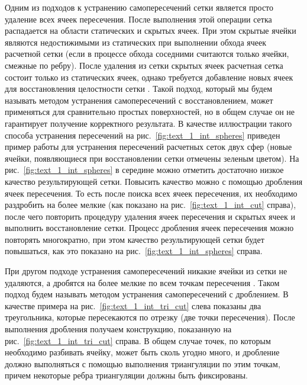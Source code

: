 Одним из подходов к устранению самопересечений сетки является просто удаление всех ячеек пересечения.
После выполнения этой операции сетка распадается на области статических и скрытых ячеек.
При этом скрытые ячейки являются недостижимыми из статических при выполнении обхода ячеек расчетной сетки (если в процессе обхода соседними считаются только ячейки, смежные по ребру).
После удаления из сетки скрытых ячеек расчетная сетка состоит только из статических ячеек, однако требуется добавление новых ячеек для восстановления целостности сетки \cite{Charton2021Repair}.
Такой подход, который мы будем называть методом устранения самопересечений с восстановлением\label{term:method_selfint_repare}, может применяться для сравнительно простых поверхностей, но в общем случае он не гарантирует получение корректного результата.
В качестве иллюстрации такого способа устранения пересечений на рис.~\ref{fig:text_1_int_spheres} приведен пример работы для устранения пересечений расчетных сеток двух сфер (новые ячейки, появляющиеся при восстановлении сетки отмечены зеленым цветом).
На рис.~\ref{fig:text_1_int_spheres} в середине можно отметить достаточно низкое качество результирующей сетки.
Повысить качество можно с помощью дробления ячеек пересечения.
То есть после поиска всех ячеек пересечения, их необходимо раздробить на более мелкие (как показано на рис.~\ref{fig:text_1_int_cut} справа), после чего повторить процедуру удаления ячеек пересечения и скрытых ячеек и выполнить восстановление сетки.
Процесс дробления ячеек пересечения можно повторять многократно, при этом качество результирующей сетки будет повышаться, как это показано на рис.~\ref{fig:text_1_int_spheres} справа.

При другом подходе устранения самопересечений никакие ячейки из сетки не удаляются, а дробятся на более мелкие по всем точкам пересечения \cite{Skorkovska2018Int}.
Таком подход будем называть методом устранения самопересечений с дроблением\label{term:method_selfint_cut}.
В качестве примера на рис.~\ref{fig:text_1_int_tri_cut} слева показаны два треугольника, которые пересекаются по отрезку (две точки пересечения).
После выполнения дробления получаем конструкцию, показанную на рис.~\ref{fig:text_1_int_tri_cut} справа.
В общем случае точек, по которым необходимо разбивать ячейку, может быть сколь угодно много, и дробление должно выполняться с помощью выполнения триангуляции по этим точкам, причем некоторые ребра триангуляции должны быть фиксированы.

